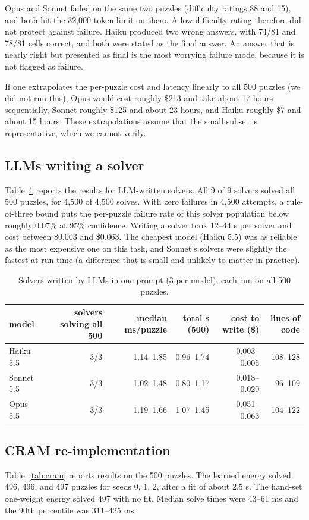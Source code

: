 \documentclass{article} %
\begin{document}
Opus and Sonnet failed on the same two puzzles (difficulty ratings 88 and 15), and both hit the 32,000-token limit on them. A low difficulty rating therefore did not protect against failure. Haiku produced two wrong answers, with 74/81 and 78/81 cells correct, and both were stated as the final answer. An answer that is nearly right but presented as final is the most worrying failure mode, because it is not flagged as failure.

If one extrapolates the per-puzzle cost and latency linearly to all 500 puzzles (we did not run this), Opus would cost roughly \$213 and take about 17 hours sequentially, Sonnet roughly \$125 and about 23 hours, and Haiku roughly \$7 and about 15 hours. These extrapolations assume that the small subset is representative, which we cannot verify.

\subsection{LLMs writing a solver}
Table~\ref{tab:write} reports the results for LLM-written solvers. All 9 of 9 solvers solved all 500 puzzles, for 4,500 of 4,500 solves. With zero failures in 4,500 attempts, a rule-of-three bound puts the per-puzzle failure rate of this solver population below roughly 0.07\% at 95\% confidence. Writing a solver took 12--44 s per solver and cost between \$0.003 and \$0.063. The cheapest model (Haiku 5.5) was as reliable as the most expensive one on this task, and Sonnet's solvers were slightly the fastest at run time (a difference that is small and unlikely to matter in practice).

\begin{table}[t]
\centering
\caption{Solvers written by LLMs in one prompt (3 per model), each run on all 500 puzzles.}
\label{tab:write}
\begin{tabular}{lrrrrr}
\toprule
model & solvers solving all 500 & median ms/puzzle & total s (500) & cost to write (\$) & lines of code \\
\midrule
Haiku 5.5 & 3/3 & 1.14--1.85 & 0.96--1.74 & 0.003--0.005 & 108--128 \\
Sonnet 5.5 & 3/3 & 1.02--1.48 & 0.80--1.17 & 0.018--0.020 & 96--109 \\
Opus 5.5 & 3/3 & 1.19--1.66 & 1.07--1.45 & 0.051--0.063 & 104--122 \\
\bottomrule
\end{tabular}
\end{table}

\subsection{CRAM re-implementation}
Table~\ref{tab:cram} reports results on the 500 puzzles. The learned energy solved 496, 496, and 497 puzzles for seeds 0, 1, 2, after a fit of about 2.5 s. The hand-set one-weight energy solved 497 with no fit. Median solve times were 43--61 ms and the 90th percentile was 311--425 ms.
\end{document}
